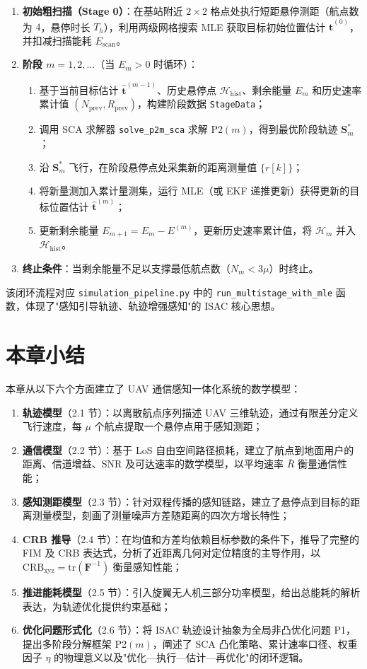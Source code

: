 \begin{enumerate}
\item \textbf{初始粗扫描（Stage 0）}：在基站附近 $2\times 2$ 格点处执行短距悬停测距（航点数为 $4$，悬停时长 $T_h$），利用两级网格搜索 MLE 获取目标初始位置估计 $\hat{\mathbf{t}}^{(0)}$，并扣减扫描能耗 $E_{\mathrm{scan}}$。
\item \textbf{阶段 $m=1,2,\ldots$}（当 $E_m>0$ 时循环）：
\begin{enumerate}
\item 基于当前目标估计 $\hat{\mathbf{t}}^{(m-1)}$、历史悬停点 $\mathcal{H}_{\mathrm{hist}}$、剩余能量 $E_m$ 和历史速率累计值 $(N_{\mathrm{prev}},R_{\mathrm{prev}})$，构建阶段数据 \texttt{StageData}；
\item 调用 SCA 求解器 \texttt{solve\_p2m\_sca} 求解 P2$(m)$，得到最优阶段轨迹 $\mathbf{S}_m^*$；
\item 沿 $\mathbf{S}_m^*$ 飞行，在阶段悬停点处采集新的距离测量值 $\{r[k]\}$；
\item 将新量测加入累计量测集，运行 MLE（或 EKF 递推更新）获得更新的目标位置估计 $\hat{\mathbf{t}}^{(m)}$；
\item 更新剩余能量 $E_{m+1}=E_m-E^{(m)}$，更新历史速率累计值，将 $\mathcal{H}_m$ 并入 $\mathcal{H}_{\mathrm{hist}}$。
\end{enumerate}
\item \textbf{终止条件}：当剩余能量不足以支撑最低航点数（$N_m<3\mu$）时终止。
\end{enumerate}

该闭环流程对应 \texttt{simulation\_pipeline.py} 中的 \texttt{run\_multistage\_with\_mle} 函数，体现了"感知引导轨迹、轨迹增强感知"的 ISAC 核心思想。

\section{本章小结}

本章从以下六个方面建立了 UAV 通信感知一体化系统的数学模型：
\begin{enumerate}
\item \textbf{轨迹模型}（2.1 节）：以离散航点序列描述 UAV 三维轨迹，通过有限差分定义飞行速度，每 $\mu$ 个航点提取一个悬停点用于感知测距；
\item \textbf{通信模型}（2.2 节）：基于 LoS 自由空间路径损耗，建立了航点到地面用户的距离、信道增益、SNR 及可达速率的数学模型，以平均速率 $\bar{R}$ 衡量通信性能；
\item \textbf{感知测距模型}（2.3 节）：针对双程传播的感知链路，建立了悬停点到目标的距离测量模型，刻画了测量噪声方差随距离的四次方增长特性；
\item \textbf{CRB 推导}（2.4 节）：在均值和方差均依赖目标参数的条件下，推导了完整的 FIM 及 CRB 表达式，分析了近距离几何对定位精度的主导作用，以 $\mathrm{CRB}_{\mathrm{xyz}}=\mathrm{tr}(\mathbf{F}^{-1})$ 衡量感知性能；
\item \textbf{推进能耗模型}（2.5 节）：引入旋翼无人机三部分功率模型，给出总能耗的解析表达，为轨迹优化提供约束基础；
\item \textbf{优化问题形式化}（2.6 节）：将 ISAC 轨迹设计抽象为全局非凸优化问题 P1，提出多阶段分解框架 P2$(m)$，阐述了 SCA 凸化策略、累计速率口径、权重因子 $\eta$ 的物理意义以及"优化—执行—估计—再优化"的闭环逻辑。
\end{enumerate}

